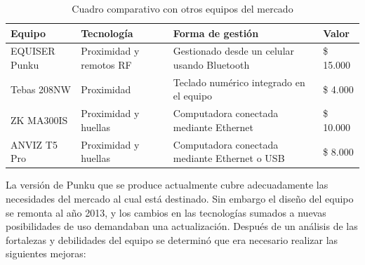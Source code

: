 \begin{table}[ht]
	\centering
	\caption{Cuadro comparativo con otros equipos del mercado}
	\begin{tabular}{C{25mm} C{25mm} C{50mm} C{20mm}}    
		\toprule
		\textbf{Equipo}  
			& \textbf{Tecnología} 
			& \textbf{Forma de gestión}
			& \textbf{Valor}  \\
		\midrule
		EQUISER \newline Punku 
			& Proximidad y remotos RF
			& Gestionado desde un \newline celular usando Bluetooth
			& \$ 15.000\\
		\midrule
		Tebas \newline 208NW \cite{noauthor_control_nodate}
			& Proximidad
			& Teclado numérico \newline integrado en el equipo
			& \$ 4.000\\
		\midrule
		ZK \newline MA300IS \cite{noauthor_control_nodate-2}
			& Proximidad \newline y huellas
			& Computadora conectada \newline mediante Ethernet
			& \$ 10.000\\
		\midrule
		ANVIZ \newline T5 Pro \cite{noauthor_control_nodate-1}
			& Proximidad \newline y huellas
			& Computadora conectada \newline mediante Ethernet o USB
			& \$ 8.000\\
		\bottomrule
		\hline
	\end{tabular}
	\label{tab:ComparacionActual}
\end{table}

La versión de Punku que se produce actualmente cubre adecuadamente las necesidades del mercado al cual está destinado. Sin embargo el diseño del equipo se remonta al año 2013, y los cambios en las tecnologías sumados a nuevas posibilidades de uso demandaban una actualización. Después de un análisis de las fortalezas y debilidades del equipo se determinó que era necesario realizar las siguientes mejoras:  

